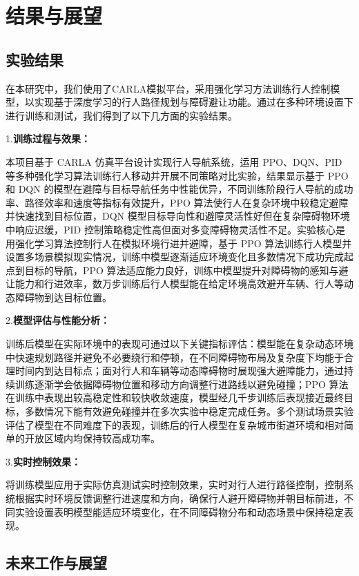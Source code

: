 \chapter{结果与展望}

\section{实验结果}

在本研究中，我们使用了CARLA模拟平台，采用强化学习方法训练行人控制模型，以实现基于深度学习的行人路径规划与障碍避让功能。通过在多种环境设置下进行训练和测试，我们得到了以下几方面的实验结果。

1.\textbf{训练过程与效果：}

本项目基于 CARLA 仿真平台设计实现行人导航系统，运用 PPO、DQN、PID 等多种强化学习算法训练行人移动并开展不同策略对比实验，结果显示基于 PPO 和 DQN 的模型在避障与目标导航任务中性能优异，不同训练阶段行人导航的成功率、路径效率和速度等指标有效提升，PPO 算法使行人在复杂环境中较稳定避障并快速找到目标位置，DQN 模型目标导向性和避障灵活性好但在复杂障碍物环境中响应迟缓，PID 控制策略稳定性高但面对多变障碍物灵活性不足。实验核心是用强化学习算法控制行人在模拟环境行进并避障，基于 PPO 算法训练行人模型并设置多场景模拟现实情况，训练中模型逐渐适应环境变化且多数情况下成功完成起点到目标的导航，PPO 算法适应能力良好，训练中模型提升对障碍物的感知与避让能力和行进效率，数万步训练后行人模型能在给定环境高效避开车辆、行人等动态障碍物到达目标位置。

2.\textbf{模型评估与性能分析：}

训练后模型在实际环境中的表现可通过以下关键指标评估：模型能在复杂动态环境中快速规划路径并避免不必要绕行和停顿，在不同障碍物布局及复杂度下均能于合理时间内到达目标点；面对行人和车辆等动态障碍物时展现强大避障能力，通过持续训练逐渐学会依据障碍物位置和移动方向调整行进路线以避免碰撞；PPO 算法在训练中表现出较高稳定性和较快收敛速度，模型经几千步训练后表现接近最终目标，多数情况下能有效避免碰撞并在多次实验中稳定完成任务。多个测试场景实验评估了模型在不同难度下的表现，训练后的行人模型在复杂城市街道环境和相对简单的开放区域内均保持较高成功率。

3.\textbf{实时控制效果：}

将训练模型应用于实际仿真测试实时控制效果，实时对行人进行路径控制，控制系统根据实时环境反馈调整行进速度和方向，确保行人避开障碍物并朝目标前进，不同实验设置表明模型能适应环境变化，在不同障碍物分布和动态场景中保持稳定表现。

\section{未来工作与展望}

